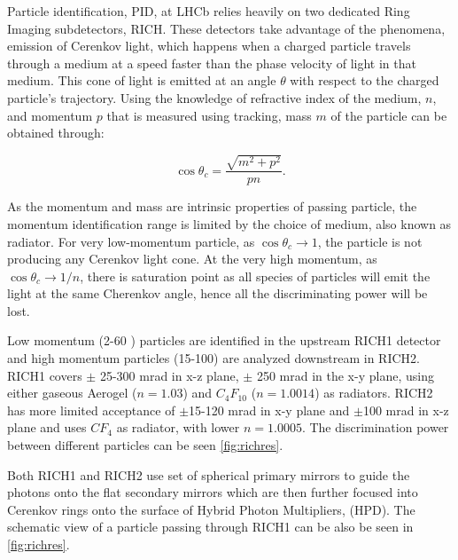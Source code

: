 Particle identification, \Gls{PID}, at \Gls{LHCb} relies heavily on two dedicated Ring Imaging subdetectors, \gls{RICH}. These detectors take advantage of the phenomena, emission of Cerenkov light, which happens when a charged particle travels through a medium at a speed faster than the phase velocity of light in that medium. This cone of light is emitted at an angle $\theta$ with respect to the charged particle's trajectory. Using the knowledge of refractive index of the medium, $n$, and momentum $p$ that is measured using tracking, mass $m$ of the particle can be obtained through:

\begin{equation}
	\cos\theta_{c} =  \frac{\sqrt{m^{2} + p^{2}}}{pn}.
\end{equation}

As the momentum and mass are intrinsic properties of passing particle, the momentum identification range is limited by the choice of medium, also known as radiator. For very low-momentum particle, as $\cos\theta_{c} \rightarrow 1$, the particle is not producing any Cerenkov light cone. At the very high momentum, as $\cos\theta_{c} \rightarrow 1/n$, there is saturation point as all species of particles will emit the light at the same Cherenkov angle, hence all the discriminating power will be lost.

Low momentum (2-60 \gev) particles are identified in the upstream \gls{RICH1} detector and high momentum particles (15-100) \gev are analyzed downstream in \gls{RICH2}. \gls{RICH1} covers $\pm$ 25-300 mrad in x-z plane, $\pm$ 250 mrad in the x-y plane, using either gaseous Aerogel ($n=1.03$) and $C_{4}F_{10}$ ($n = 1.0014$) as radiators. \gls{RICH2} has more limited acceptance of $\pm$15-120 mrad in x-y plane and $\pm$100 mrad in x-z plane and uses $CF_{4}$ as radiator, with lower $n=1.0005$. The discrimination power between different particles can be seen \autoref{fig:richres}. 


Both \gls{RICH1} and \gls{RICH2} use set of spherical primary mirrors to guide the photons onto the flat secondary mirrors which are then further focused into Cerenkov rings onto the surface of Hybrid Photon Multipliers, (\Gls{HPD}). The schematic view of a particle passing through \gls{RICH1} can be also be seen in \autoref{fig:richres}. 


